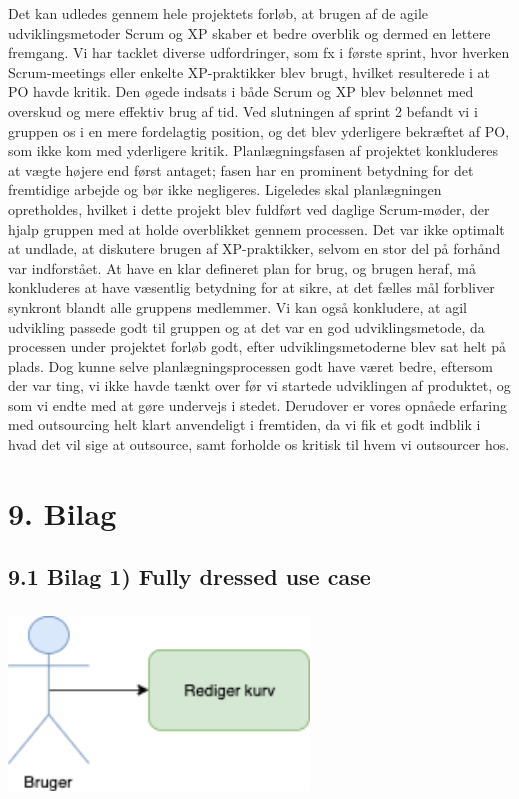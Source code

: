 \documentclass[11pt]{report}
\begin{document}
Det kan udledes gennem hele projektets forløb, at brugen af de agile udviklingsmetoder Scrum og XP skaber et bedre overblik og dermed en lettere fremgang. Vi har tacklet diverse udfordringer, som fx i første sprint, hvor hverken Scrum-meetings eller enkelte XP-praktikker blev brugt, hvilket resulterede i at PO havde kritik. Den øgede indsats i både Scrum og XP blev belønnet med overskud og mere effektiv brug af tid. Ved slutningen af sprint 2 befandt vi i gruppen os i en mere fordelagtig position, og det blev yderligere bekræftet af PO, som ikke kom med yderligere kritik.
Planlægningsfasen af projektet konkluderes at vægte højere end først antaget; fasen har en prominent betydning for det fremtidige arbejde og bør ikke negligeres. Ligeledes skal planlægningen opretholdes, hvilket i dette projekt blev fuldført ved daglige Scrum-møder, der hjalp gruppen med at holde overblikket gennem processen.
Det var ikke optimalt at undlade, at diskutere brugen af XP-praktikker, selvom en stor del på forhånd var indforstået. At have en klar defineret plan for brug, og brugen heraf, må konkluderes at have væsentlig betydning for at sikre, at det fælles mål forbliver synkront blandt alle gruppens medlemmer.
Vi kan  også konkludere, at agil udvikling passede godt til gruppen og at det var en god udviklingsmetode, da processen under projektet forløb godt, efter udviklingsmetoderne blev sat helt på plads. Dog kunne selve planlægningsprocessen godt have været bedre, eftersom der var ting, vi ikke havde tænkt over før vi startede udviklingen af produktet, og som vi endte med at gøre undervejs i stedet. 
Derudover er vores opnåede erfaring med outsourcing helt klart anvendeligt i fremtiden, da vi fik et godt indblik i hvad det vil sige at outsource, samt forholde os kritisk til hvem vi outsourcer hos.

\chapter*{9. Bilag}

\section*{9.1 Bilag 1) Fully dressed use case}
\includegraphics[width=8cm, height=5cm]{FullyDressedUseCase.png}
\end{document}
